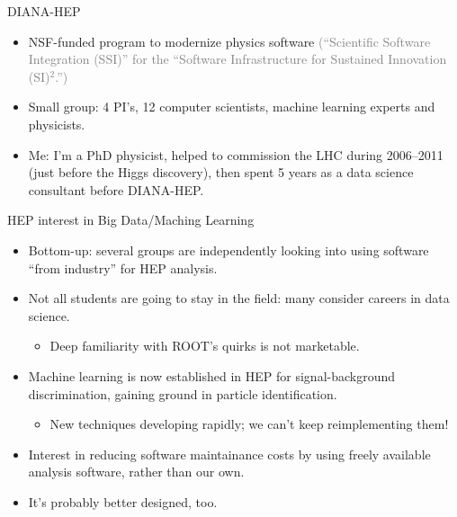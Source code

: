\documentclass{beamer}
\begin{document}
\begin{frame}{DIANA-HEP}
\begin{itemize}
\item NSF-funded program to modernize physics software \textcolor{gray}{(``Scientific Software Integration (SSI)'' for the ``Software Infrastructure for Sustained Innovation (SI)$^2$.'')}
\item Small group: 4 PI's, 12 computer scientists, machine learning experts and physicists.
\item Me: I'm a PhD physicist, helped to commission the LHC during 2006--2011 (just before the Higgs discovery), then spent 5 years as a data science consultant before DIANA-HEP.
\end{itemize}
\end{frame}

\begin{frame}{HEP interest in Big Data/Maching Learning}
\begin{itemize}
\item Bottom-up: several groups are independently looking into using software ``from industry'' for HEP analysis.
\item Not all students are going to stay in the field: many consider careers in data science.
\begin{itemize}
\item Deep familiarity with ROOT's quirks is not marketable.
\end{itemize}
\item Machine learning is now established in HEP for signal-background discrimination, gaining ground in particle identification.
\begin{itemize}
\item New techniques developing rapidly; we can't keep reimplementing them!
\end{itemize}
\item Interest in reducing software maintainance costs by using freely available analysis software, rather than our own.
\item It's probably better designed, too.
\end{itemize}
\end{frame}
\end{document}
